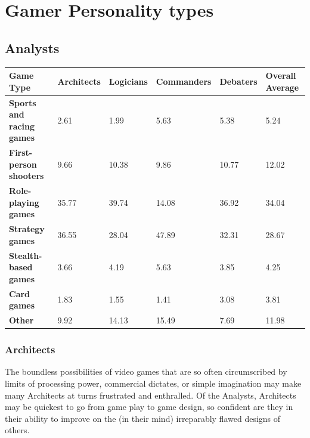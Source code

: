 \documentclass{article}
\begin{document}
\clearpage

\section{Gamer Personality types}
\subsection{Analysts}


\begin{table}[htp]
\begin{tabular}{|l|l|l|l|l|l|}
\hline
\textbf{Game Type} & \textbf{Architects} & \textbf{Logicians} & \textbf{Commanders} & \textbf{Debaters} & \textbf{Overall Average} \\ \hline
\textbf{Sports and racing games} &2.61           &1.99           &5.63           &5.38           &5.24           \\ \hline
\textbf{First-person shooters} &9.66           &10.38           &9.86           &10.77           &12.02           \\ \hline
\textbf{Role-playing games} &35.77           &39.74           &14.08           &36.92           &34.04           \\ \hline
\textbf{Strategy games} &36.55           &28.04           &      47.89     &32.31           &28.67           \\ \hline
\textbf{Stealth-based games} &3.66           &4.19           &5.63           &3.85          &4.25           \\ \hline
\textbf{Card games} &1.83           &1.55           &         1.41  &3.08           &3.81           \\ \hline
\textbf{Other} &9.92           &14.13           & 15.49          &7.69           &11.98           \\ \hline
\end{tabular}
\end{table}

\subsubsection{Architects}
The boundless possibilities of video games that are so often circumscribed by limits of processing power, commercial dictates, or simple imagination may make many Architects at turns frustrated and enthralled. Of the Analysts, Architects may be quickest to go from game play to game design, so confident are they in their ability to improve on the (in their mind) irreparably flawed designs of others.
\end{document}
